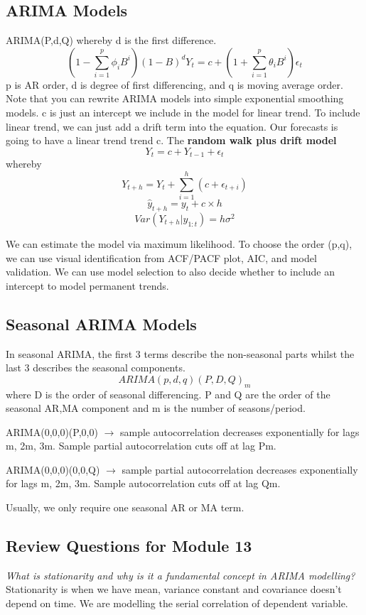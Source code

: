 \documentclass[11pt, oneside]{article}
\theoremstyle{definition}
\begin{document}
\subsection{ARIMA Models}
ARIMA(P,d,Q) whereby d is the first difference.
$$
(1 - \sum\limits_{i=1}^p\phi_iB^i)(1-B)^dY_t = c + (1 + \sum\limits_{i=1}^p\theta_iB^i)\epsilon_t
$$
p is AR order, d is degree of first differencing, and q is moving average order. Note that you can rewrite ARIMA models into simple exponential smoothing models. c is just an intercept we include in the model for linear trend. To include linear trend, we can just add a drift term into the equation. Our forecasts is going to have a linear trend trend c. The \textbf{random walk plus drift model}
$$
Y_t = c + Y_{t-1} + \epsilon_t
$$
whereby
$$
Y_{t+h} = Y_t + \sum\limits_{i=1}^{h}(c + \epsilon_{t+i})
$$
$$
\hat{y}_{t+h} = y_t + c \times h
$$
$$
Var(Y_{t+h}|y_{1:t}) = h\sigma^2
$$

We can estimate the model via maximum likelihood. To choose the order (p,q), we can use visual identification from ACF/PACF plot, AIC, and model validation. We can use model selection to also decide whether to include an intercept to model permanent trends.

\subsection{Seasonal ARIMA Models}
In seasonal ARIMA, the first 3 terms describe the non-seasonal parts whilst the last 3 describes the seasonal components.
$$
ARIMA (p,d,q)(P,D,Q)_m
$$
where D is the order of seasonal differencing. P and Q are the order of the seasonal AR,MA component and m is the number of seasons/period.

ARIMA(0,0,0)(P,0,0) $\rightarrow$ sample autocorrelation decreases exponentially for lags m, 2m, 3m. Sample partial autocorrelation cuts off at lag Pm.

ARIMA(0,0,0)(0,0,Q) $\rightarrow$ sample partial autocorrelation decreases exponentially for lags m, 2m, 3m. Sample autocorrelation cuts off at lag Qm.

Usually, we only require one seasonal AR or MA term.

\subsection{Review Questions for Module 13}
\textit{What is stationarity and why is it a fundamental concept in ARIMA modelling?}
Stationarity is when we have mean, variance constant and covariance doesn't depend on time. We are modelling the serial correlation of dependent variable.
\end{document}
